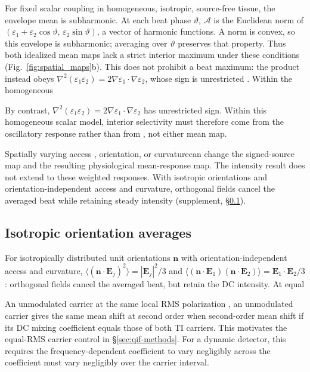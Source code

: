 \documentclass[11pt,a4paper]{article}
\newif\ifjne
\providecommand{\DIFaddtex}[1]{{\protect\color{blue} \sf #1}} %
\providecommand{\DIFdeltex}[1]{{\protect\color{red} \scriptsize #1}} %
\providecommand{\DIFaddbegin}{} %
\providecommand{\DIFaddend}{} %
\providecommand{\DIFdelbegin}{} %
\providecommand{\DIFdelend}{} %
\providecommand{\DIFadd}[1]{\texorpdfstring{\DIFaddtex{#1}}{#1}} %
\providecommand{\DIFdel}[1]{\texorpdfstring{\DIFdeltex{#1}}{}} %
\begin{document}
\DIFadd{For fixed scalar coupling in homogeneous, isotropic, source-free tissue,
the envelope mean is subharmonic}\DIFaddend . At each beat phase $\vartheta$,
$\mathcal A$ is the Euclidean norm of
$(\varepsilon_1+\varepsilon_2\cos\vartheta,\,\varepsilon_2\sin\vartheta)$,
a vector of harmonic functions. A norm is convex, so this envelope is subharmonic;
averaging over $\vartheta$ preserves that property. Thus both idealized mean maps
lack a strict interior maximum under these conditions (Fig.~\ref{fig:spatial_maps}b).
\DIFdelbegin \DIFdel{This does not prohibit a beat maximum: the product instead obeys
$\nabla^2(\varepsilon_1\varepsilon_2)=2\nabla\varepsilon_1\cdot\nabla\varepsilon_2$,
whose sign is unrestricted . Within the homogeneous }\DIFdelend \DIFaddbegin

\fi
\DIFadd{By contrast,
$\nabla^2(\varepsilon_1\varepsilon_2)=2\nabla\varepsilon_1\cdot\nabla\varepsilon_2$
has unrestricted sign. Within this homogeneous scalar }\DIFaddend model, interior
selectivity must \DIFdelbegin \DIFdel{therefore }\DIFdelend come from the oscillatory response\DIFdelbegin \DIFdel{rather than from }\DIFdelend \DIFaddbegin \DIFadd{, not }\DIFaddend either mean map.
\DIFdelbegin %

\DIFdel{Spatially varying access , orientation, or curvaturecan change the signed-source
map and the resulting physiological mean-response map. The intensity
result does
not extend to these weighted responses.
}\DIFdelend \DIFaddbegin \DIFadd{With isotropic orientations and orientation-independent access and curvature,
orthogonal fields cancel the averaged beat while retaining steady intensity
(supplement, \S\ref{supp:orientation}).
}\ifjne\else
\subsection{\DIFadd{Isotropic orientation averages}}\label{supp:orientation}
\DIFaddend For isotropically distributed unit orientations
$\mathbf n$ with orientation-independent access and curvature,
$\langle(\mathbf n\cdot\mathbf E_j)^2\rangle=|\mathbf E_j|^2/3$
and $\langle(\mathbf n\cdot\mathbf E_1)(\mathbf n\cdot\mathbf E_2)\rangle
=\mathbf E_1\cdot\mathbf E_2/3$: orthogonal fields cancel the averaged beat,
but retain the DC intensity.
\DIFdelbegin \DIFdel{At equal }\DIFdelend \DIFaddbegin

\fi
\DIFadd{An unmodulated carrier at the same }\DIFaddend local RMS polarization \DIFdelbegin \DIFdel{, an unmodulated
carrier }\DIFdelend gives the same
\DIFdelbegin \DIFdel{mean shift at second order when }\DIFdelend \DIFaddbegin \DIFadd{second-order mean shift if }\DIFaddend its DC mixing coefficient equals those of both
TI carriers. \DIFaddbegin \DIFadd{This motivates the equal-RMS carrier control in
\S\ref{sec:qif-methods}. }\DIFaddend For a dynamic detector, \DIFdelbegin \DIFdel{this requires the frequency-dependent coefficient to vary
negligibly across }\DIFdelend the \DIFaddbegin \DIFadd{coefficient must vary
negligibly over the }\DIFaddend carrier interval.
\end{document}
